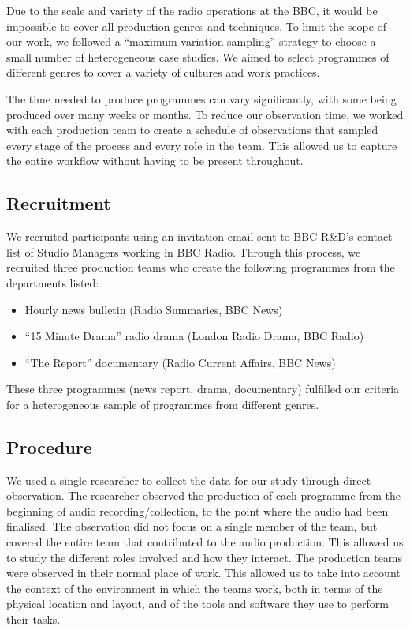 Due to the scale and variety of the radio operations at the BBC, it would be impossible to cover all production genres
and techniques. To limit the scope of our work, we followed a ``maximum variation sampling'' strategy \citep[p.
172]{Patton1990} to choose a small number of heterogeneous case studies. We aimed to select programmes of different
genres to cover a variety of cultures and work practices.

The time needed to produce programmes can vary significantly, with some being produced over many weeks or months. To
reduce our observation time, we worked with each production team to create a schedule of observations that sampled
every stage of the process and every role in the team. This allowed us to capture the entire workflow without having to
be present throughout.

\subsection{Recruitment}
We recruited participants using an invitation email sent to BBC R\&D's contact list of Studio Managers working in BBC
Radio. Through this process, we recruited three production teams who create the following programmes from the
departments listed:
\begin{itemize}
	\item Hourly news bulletin (Radio Summaries, BBC News)
	\item ``15 Minute Drama'' radio drama (London Radio Drama, BBC Radio)
	\item ``The Report'' documentary (Radio Current Affairs, BBC News)
\end{itemize}

These three programmes (news report, drama, documentary) fulfilled our criteria for a heterogeneous sample of
programmes from different genres.

\subsection{Procedure}
We used a single researcher to collect the data for our study through direct observation. The researcher observed the
production of each programme from the beginning of audio recording/collection, to the point where the audio had been
finalised. The observation did not focus on a single member of the team, but covered the entire team that
contributed to the audio production. This allowed us to study the different roles involved  and how they interact.  The
production teams were observed in their normal place of work. This allowed us to take into account the context of the
environment in which the teams work, both in terms of the physical location and layout, and of the tools and software
they use to perform their tasks.

